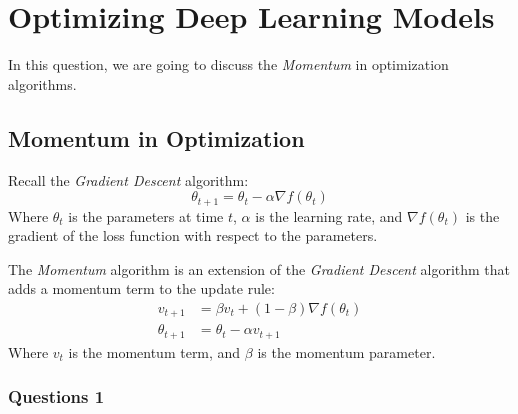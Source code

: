 \section{Optimizing Deep Learning Models}

In this question, we are going to discuss the \textit{Momentum} in optimization algorithms.

\subsection{Momentum in Optimization}

Recall the \textit{Gradient Descent} algorithm:
\[
\theta_{t+1} = \theta_t - \alpha \nabla f(\theta_t)
\]
Where \(\theta_t\) is the parameters at time \(t\), \(\alpha\) is the learning rate, and \(\nabla f(\theta_t)\) is the gradient of the loss function with respect to the parameters.

The \textit{Momentum} algorithm is an extension of the \textit{Gradient Descent} algorithm that adds a momentum term to the update rule:
\[
\begin{aligned}
v_{t+1} &= \beta v_t + (1 - \beta) \nabla f(\theta_t) \\
\theta_{t+1} &= \theta_t - \alpha v_{t+1}
\end{aligned}
\]
Where \(v_t\) is the momentum term, and \(\beta\) is the momentum parameter.
\subsubsection{Questions 1}

